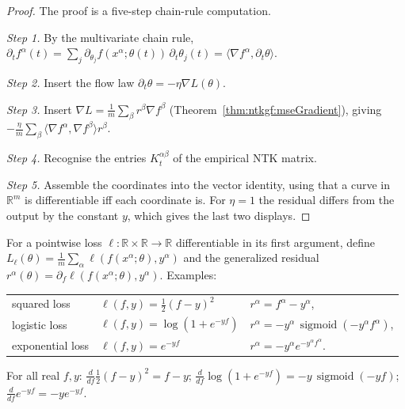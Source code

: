 \begin{proof}
  \leanok
The proof is a five-step chain-rule computation.

\emph{Step 1.} By the multivariate chain rule,
$\partial_tf^\alpha(t)=\sum_{j}\partial_{\theta_j}f(x^\alpha;\theta(t))\,\partial_t\theta_j(t)=\langle\nabla f^\alpha,\partial_t\theta\rangle$.

\emph{Step 2.} Insert the flow law $\partial_t\theta=-\eta\nabla L(\theta)$.

\emph{Step 3.} Insert $\nabla L=\frac1m\sum_\beta r^\beta\nabla f^\beta$ (Theorem~\ref{thm:ntkgf:mseGradient}), giving
$-\frac\eta m\sum_\beta\langle\nabla f^\alpha,\nabla f^\beta\rangle r^\beta$.

\emph{Step 4.} Recognise the entries $K_t^{\alpha\beta}$ of the empirical NTK matrix.

\emph{Step 5.} Assemble the coordinates into the vector identity, using that a curve in $\mathbb R^m$ is differentiable iff each coordinate is.
For $\eta=1$ the residual differs from the output by the constant $y$, which gives the last two displays.
\end{proof}

\begin{definition}\label{def:ntkgf:generalizedRisk}
  \leanok
For a pointwise loss $\ell:\mathbb R\times\mathbb R\to\mathbb R$ differentiable in its first argument, define
$L_\ell(\theta)=\frac1m\sum_\alpha\ell(f(x^\alpha;\theta),y^\alpha)$ and the generalized residual
$r^\alpha(\theta)=\partial_f\ell(f(x^\alpha;\theta),y^\alpha)$. Examples:
\begin{center}
\begin{tabular}{lll}
  squared loss & $\ell(f,y)=\tfrac12(f-y)^2$ & $r^\alpha=f^\alpha-y^\alpha$,\\
  logistic loss & $\ell(f,y)=\log(1+e^{-yf})$ & $r^\alpha=-y^\alpha\,\operatorname{sigmoid}(-y^\alpha f^\alpha)$,\\
  exponential loss & $\ell(f,y)=e^{-yf}$ & $r^\alpha=-y^\alpha e^{-y^\alpha f^\alpha}$.
\end{tabular}
\end{center}
\end{definition}

\begin{lemma}\label{lem:ntkgf:exampleLosses}
  \leanok
For all real $f,y$: $\frac{d}{df}\tfrac12(f-y)^2=f-y$; $\frac{d}{df}\log(1+e^{-yf})=-y\,\operatorname{sigmoid}(-yf)$;
$\frac{d}{df}e^{-yf}=-ye^{-yf}$.
\end{lemma}

